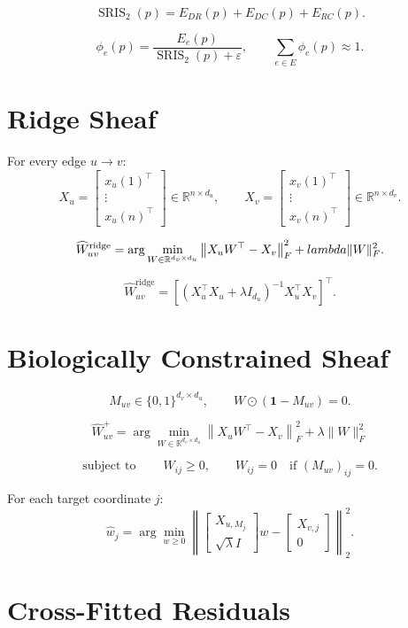 \documentclass[11pt]{article}
\begin{document}
\[
\operatorname{SRIS}_{2}(p)=E_{DR}(p)+E_{DC}(p)+E_{RC}(p).
\]

\[
\phi_e(p)=\frac{E_e(p)}{\operatorname{SRIS}_{2}(p)+\varepsilon},
\qquad
\sum_{e\in E}\phi_e(p)\approx 1.
\]

\section*{Ridge Sheaf}

For every edge $u\to v$:
\[
X_u=\begin{bmatrix}x_u(1)^\top\\ \vdots\\ x_u(n)^\top\end{bmatrix}\in\mathbb R^{n\times d_u},
\qquad
X_v=\begin{bmatrix}x_v(1)^\top\\ \vdots\\ x_v(n)^\top\end{bmatrix}\in\mathbb R^{n\times d_v}.
\]

\[
\widehat W_{uv}^{\mathrm{ridge}}
=\arg\min_{W\in\mathbb R^{d_v\times d_u}}
\left\|X_uW^\top-X_v\right\|_F^2+\\lambda\|W\|_F^2.
\]

\[
\widehat W_{uv}^{\mathrm{ridge}}
=
\left[(X_u^\top X_u+\lambda I_{d_u})^{-1}X_u^\top X_v\right]^\top.
\]

\section*{Biologically Constrained Sheaf}

\[
M_{uv}\in\{0,1\}^{d_v\times d_u},
\qquad
W\odot (\mathbf 1-M_{uv})=0.
\]

\[
\widehat W_{uv}^{+}
=\arg\min_{W\in\mathbb R^{d_v\times d_u}}
\left\|X_uW^\top-X_v\right\|_F^2+
\lambda\|W\|_F^2
\]

\[
\text{subject to}\
\qquad
W_{ij}\ge 0,
\qquad
W_{ij}=0\quad\text{if }(M_{uv})_{ij}=0.
\]

For each target coordinate $j$:
\[
\widehat w_j
=
\arg\min_{w\ge 0}
\left\|
\begin{bmatrix}X_{u,M_j}\\ \sqrt{\lambda}I\end{bmatrix}w
-
\begin{bmatrix}X_{v,j}\\0\end{bmatrix}
\right\|_2^2.
\]

\section*{Cross-Fitted Residuals}
\end{document}
